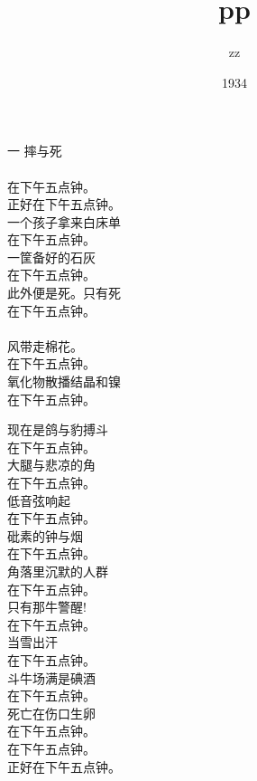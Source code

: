 \documentclass{article}
\title{pp}
\author{zz}
\date{1934}
\begin{document}

\maketitle

\setlength\parindent{0pt}

\begin{center}

\begin{minipage}{0.5\linewidth}

\Large

﻿一 摔与死 \\
 \\
在下午五点钟。 \\
正好在下午五点钟。 \\
一个孩子拿来白床单 \\
在下午五点钟。 \\
一筐备好的石灰 \\
在下午五点钟。 \\
此外便是死。只有死 \\
在下午五点钟。 \\
 \\
风带走棉花。 \\
在下午五点钟。 \\
氧化物散播结晶和镍 \\
在下午五点钟。 \\

\end{minipage}

\newpage

\begin{minipage}{0.5\linewidth}

\Large

现在是鸽与豹搏斗 \\
在下午五点钟。 \\
大腿与悲凉的角 \\
在下午五点钟。 \\
低音弦响起 \\
在下午五点钟。 \\
砒素的钟与烟 \\
在下午五点钟。 \\
角落里沉默的人群 \\
在下午五点钟。 \\
只有那牛警醒! \\
在下午五点钟。 \\
当雪出汗 \\
在下午五点钟。 \\
斗牛场满是碘酒 \\
在下午五点钟。 \\
死亡在伤口生卵 \\
在下午五点钟。 \\
在下午五点钟。 \\
正好在下午五点钟。 \\


\end{minipage}
\end{center}
\end{document}
